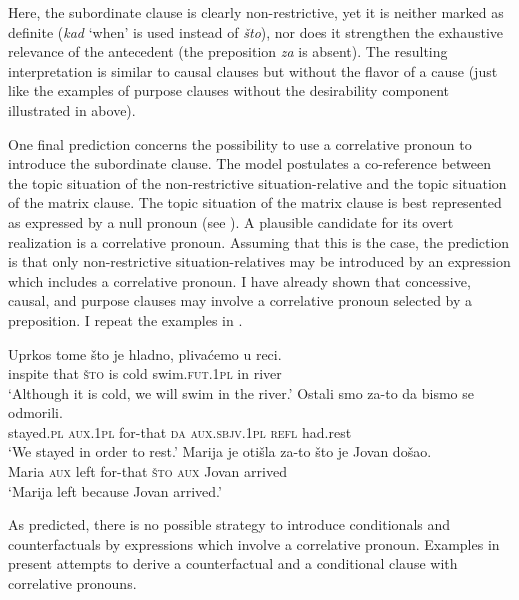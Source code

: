 \documentclass[output=paper,
colorlinks,
citecolor=brown,
newtxmath
]{langscibook}
\begin{document}
\noindent Here, the subordinate clause is clearly non-restrictive, yet it is neither marked as definite (\textit{kad} `when' is used instead of \textit{što}), nor does it strengthen the exhaustive relevance of the antecedent (the preposition \textit{za} is absent). The resulting interpretation is similar to causal clauses but without the flavor of a cause (just like the examples of purpose clauses without the desirability component illustrated in  above).

One final prediction concerns the possibility to use a correlative pronoun to introduce the subordinate clause. The model postulates a co-reference between the topic situation of the non-restrictive situation-relative and the topic situation of the matrix clause. The topic situation of the matrix clause is best represented as expressed by a null pronoun (see \citealt{Vries2002}). A plausible candidate for its overt realization is a correlative pronoun. Assuming that this is the case, the prediction is that only non-restrictive situation-relatives may be introduced by an expression which includes a correlative pronoun. I have already shown that concessive, causal, and purpose clauses may involve a correlative pronoun selected by a preposition. I repeat the examples in .

\ea\label{ex:Correl1}
	\ea \gll Uprkos tome što je hladno, plivaćemo u reci.\\
    inspite that \textsc{što} is cold swim.\textsc{fut.1pl} in river\\
    \glt `Although it is cold, we will swim in the river.'\label{ex:Correl1-a}
    \ex \gll Ostali smo za-to da bismo se odmorili.\\
    stayed.\textsc{pl} \textsc{aux.1pl} for-that \textsc{da} \textsc{aux.sbjv.1pl} \textsc{refl} had.rest\\
    \glt `We stayed in order to rest.'\label{ex:Correl1-b}
	\ex \gll Marija je otišla za-to što je Jovan došao.\\
    Maria \textsc{aux} left for-that \textsc{što} \textsc{aux} Jovan arrived\\
    \glt `Marija left because Jovan arrived.'\label{ex:Correl1-c}
\z\z

\noindent As predicted, there is no possible strategy to introduce conditionals and counterfactuals by expressions which involve a correlative pronoun. Examples in  present attempts to derive a counterfactual and a conditional clause with correlative pronouns.
\end{document}
